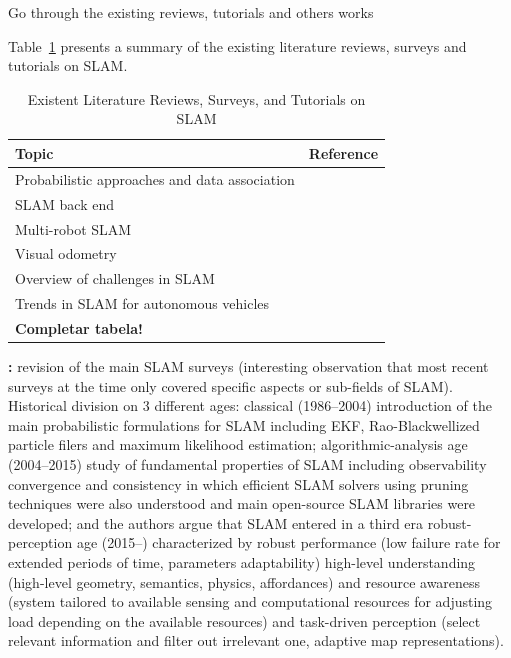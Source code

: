 \documentclass[10pt,a4paper,notitlepage,twocolumn,oneside]{article}
\begin{document}
Go through the existing reviews, tutorials and others works

Table~\ref{tab:purpose:current-literature} presents a summary of the existing literature reviews, surveys and tutorials on SLAM.

\begin{table}[!t]
  \renewcommand{\arraystretch}{1.2}
  \setlength{\tabcolsep}{1.75pt}
  \caption[Existent Literature Reviews, Surveys, and Tutorials on SLAM]{Existent Literature Reviews, Surveys, and Tutorials on SLAM}
  \label{tab:purpose:current-literature}
  \vspace{0.5em}
  \centering
  {\scriptsize
  \begin{tabular}{p{} p{}}

\hline
\textbf{Topic} & \textbf{Reference}\\
\hline
Probabilistic approaches and data association%
& \cite{background:slam:durrant-whyte-bailey,background:slam:bailey-durrant-whyte}\\
SLAM back end%
& \cite{background:slam:grisetti}\\
Multi-robot SLAM%
& \cite{review:saeedi:2016}\\
Visual odometry%
& \cite{background:slam:scaramuzza-fraundorfer,background:slam:fraundorfer-scaramuzza}\\
Overview of challenges in SLAM%
& \cite{review:cadena:2016}\\
Trends in SLAM for autonomous vehicles%
& \cite{review:bresson:2017}\\
\textbf{Completar tabela!}\\
\hline

  \end{tabular}}
\end{table}



\textbf{\cite{review:cadena:2016}:} revision of the main SLAM surveys (interesting observation that most recent surveys at the time only covered specific aspects or sub-fields of SLAM). Historical division on 3 different ages: classical (1986--2004) introduction of the main probabilistic formulations for SLAM including EKF, Rao-Blackwellized particle filers and maximum likelihood estimation; algorithmic-analysis age (2004--2015) study of fundamental properties of SLAM including observability convergence and consistency in which efficient SLAM solvers using pruning techniques were also understood and main open-source SLAM libraries were developed; and the authors \cite{review:cadena:2016} argue that SLAM entered in a third era robust-perception age (2015--) characterized by robust performance (low failure rate for extended periods of time, parameters adaptability) high-level understanding (high-level geometry, semantics, physics, affordances) and resource awareness (system tailored to available sensing and computational resources for adjusting load depending on the available resources) and task-driven perception (select relevant information and filter out irrelevant one, adaptive map representations).
\end{document}
